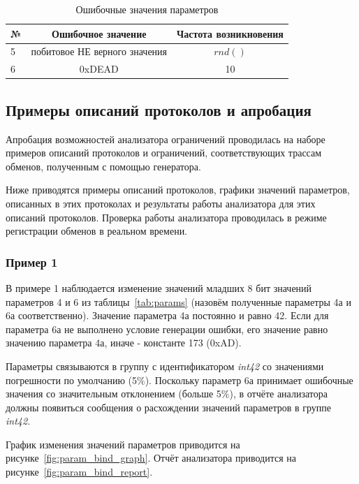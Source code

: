 \begin{table}[H]
 \centering
 \begin{tabular}{|l|c|c|}
  \hline
  № & Ошибочное значение & Частота возникновения \\
  \hline
  5 & побитовое НЕ верного значения & $rnd()$ \\
  6 & 0xDEAD & 10 \\
  \hline
 \end{tabular}
 \caption{Ошибочные значения параметров}
 \label{tab:param_errors}
\end{table}

\subsection{Примеры описаний протоколов и апробация}

Апробация возможностей анализатора ограничений проводилась на наборе примеров 
описаний протоколов и ограничений, соответствующих трассам обменов, полученным 
с помощью генератора.

Ниже приводятся примеры описаний протоколов, графики значений параметров, 
описанных в этих протоколах и результаты работы анализатора для этих 
описаний протоколов. Проверка работы анализатора проводилась в режиме 
регистрации обменов в реальном времени.

\subsubsection{Пример 1}

В примере 1 наблюдается изменение значений младших 8 бит значений параметров 4 
и 6 из таблицы~\ref{tab:params} (назовём полученные параметры 4а и 6а 
соответственно). Значение параметра 4а 
постоянно и равно 42. Если для параметра 6а не выполнено условие генерации 
ошибки, его значение равно значению параметра 4а, иначе - константе 173 (0xAD). 

Параметры связываются в группу с идентификатором \textit{int42} со 
значениями погрешности по умолчанию (5\%). Поскольку параметр 6а принимает 
ошибочные значения со значительным отклонением (больше 5\%), в отчёте 
анализатора должны появиться сообщения о расхождении значений параметров в 
группе \textit{int42}.

График изменения значений параметров 
приводится на рисунке~\ref{fig:param_bind_graph}. Отчёт анализатора приводится 
на рисунке~\ref{fig:param_bind_report}.



